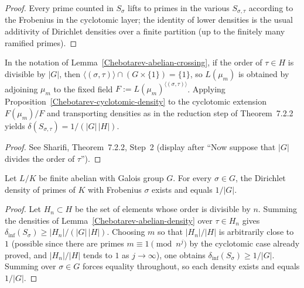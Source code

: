 {\begin{proof}
Every prime counted in $S_\sigma$ lifts to primes in the various $S_{\sigma,\tau}$ according to
the Frobenius in the cyclotomic layer; the identity of lower densities is the usual additivity
of Dirichlet densities over a finite partition (up to the finitely many ramified primes).
\end{proof}

\begin{lemma}\label{Chebotarev-abelian-density}
In the notation of Lemma~\ref{Chebotarev-abelian-crossing}, if the order of $\tau\in H$ is
divisible by $|G|$, then $\langle(\sigma,\tau)\rangle \cap (G\times\{1\}) = \{1\}$, so
$L(\mu_m)$ is obtained by adjoining $\mu_m$ to the fixed field
$F := L(\mu_m)^{\langle(\sigma,\tau)\rangle}$.  Applying Proposition~\ref{Chebotarev-cyclotomic-density}
to the cyclotomic extension $F(\mu_m)/F$ and transporting densities as in the reduction step
of Theorem~7.2.2 yields $\delta(S_{\sigma,\tau}) = 1/(|G|\,|H|)$.
\end{lemma}

\begin{proof}
See Sharifi, Theorem~7.2.2, Step~2 (display after ``Now suppose that $|G|$ divides the order of
$\tau$'').
\end{proof}

\begin{proposition}\label{Chebotarev-abelian}
Let $L/K$ be finite abelian with Galois group $G$.  For every $\sigma\in G$, the Dirichlet
density of primes of $K$ with Frobenius $\sigma$ exists and equals $1/|G|$.
\end{proposition}

\begin{proof}
Let $H_n \subset H$ be the set of elements whose order is divisible by $n$.  Summing the
densities of Lemma~\ref{Chebotarev-abelian-density} over $\tau\in H_n$ gives
$\delta_{\mathrm{inf}}(S_\sigma) \geq |H_n|/(|G|\,|H|)$.  Choosing $m$ so that $|H_n|/|H|$ is
arbitrarily close to $1$ (possible since there are primes $m\equiv 1\pmod{n^j}$ by the
cyclotomic case already proved, and $|H_n|/|H|$ tends to $1$ as $j\to\infty$), one obtains
$\delta_{\mathrm{inf}}(S_\sigma) \geq 1/|G|$.  Summing over $\sigma\in G$ forces equality
throughout, so each density exists and equals $1/|G|$.
\end{proof}

}
